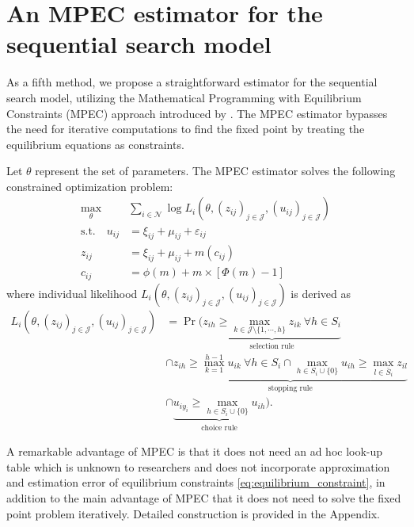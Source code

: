 \documentclass[12pt]{article}
\begin{document}
\section{An MPEC estimator for the sequential search model}
As a fifth method, we propose a straightforward estimator for the sequential search model, utilizing the Mathematical Programming with Equilibrium Constraints (MPEC) approach introduced by \cite{su2012constrained}. 
The MPEC estimator bypasses the need for iterative computations to find the fixed point by treating the equilibrium equations as constraints.

Let \(\theta\) represent the set of parameters. The MPEC estimator solves the following constrained optimization problem:
\begin{align}
    \max_{\theta}& \sum_{i\in \mathcal{N}} \log L_{i}(\theta,(z_{ij})_{j\in \mathcal{J}},(u_{ij})_{j\in \mathcal{J}})\nonumber\\
    \text{s.t.}\quad u_{i j} & =\xi_{i j}+\mu_{i j}+\varepsilon_{i j}\label{eq:mpec_formula}\\
    z_{i j}&=\xi_{i j}+\mu_{i j}+m\left(c_{i j}\right) \nonumber\\
    c_{i j}&=\phi(m)+m \times[\Phi(m)-1] \nonumber
\end{align}
where individual likelihood $L_{i}(\theta,(z_{ij})_{j\in \mathcal{J}},(u_{ij})_{j\in \mathcal{J}})$ is derived as
\begin{align}
    L_{i}(\theta,(z_{ij})_{j\in \mathcal{J}},(u_{ij})_{j\in \mathcal{J}}) &= \Pr (\underbrace{z_{ih} \geq \max_{k \in \mathcal{J}\setminus \{1,\cdots,h\}} z_{ik} \: \forall h \in S_i}_{\text{selection rule}}\nonumber\\
    & \cap \underbrace{z_{ih} \geq \max_{k = 1}^{h-1} u_{ik} \: \forall h \in S_i \cap \max_{h \in S_i \cup \{0\}} u_{ih} \geq \max_{l \in \bar{S}_i} z_{il} }_{\text{stopping rule}}\nonumber\\
    & \cap \underbrace{u_{iy_i} \geq \max_{h \in S_i \cup \{0\}} u_{ih} }_{\text{choice rule}}). \label{eq:likelihood}
\end{align}

A remarkable advantage of MPEC is that it does not need an ad hoc look-up table which is unknown to researchers and does not incorporate approximation and estimation error of equilibrium constraints \eqref{eq:equilibrium_constraint}, in addition to the main advantage of MPEC that it does not need to solve the fixed point problem iteratively. Detailed construction is provided in the Appendix.
\end{document}
